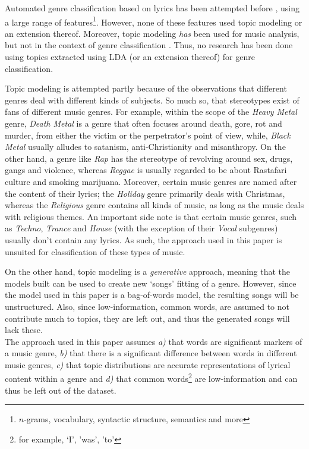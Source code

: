 
Automated genre classification based on lyrics has been attempted before \cite{fell lyrics}, using a large range of features\footnote{$n$-grams, vocabulary, syntactic structure, semantics and more}. However, none of these features used topic modeling or an extension thereof. Moreover, topic modeling \textit{has} been used for music analysis, but not in the context of genre classification \cite{lukiccomparison} \cite{liartists}. Thus, no research has been done using topics extracted using LDA (or an extension thereof) for genre classification. 

Topic modeling is attempted partly because of the observations that different genres deal with different kinds of subjects. So much so, that stereotypes exist of fans of different music genres. For example, within the scope of the \textit{Heavy Metal} genre, \textit{Death Metal} is a genre that often focuses around death, gore, rot and murder, from either the victim or the perpetrator's point of view, while, \textit{Black Metal} usually alludes to satanism, anti-Christianity and misanthropy. On the other hand, a genre like \textit{Rap} has the stereotype of revolving around sex, drugs, gangs and violence, whereas \textit{Reggae} is usually regarded to be about Rastafari culture and smoking marijuana. Moreover, certain music genres are named after the content of their lyrics; the \textit{Holiday} genre primarily deals with Christmas, whereas the \textit{Religious} genre contains all kinds of music, as long as the music deals with religious themes. An important side note is that certain music genres, such as \textit{Techno}, \textit{Trance} and \textit{House} (with the exception of their \textit{Vocal} subgenres) usually don't contain any lyrics. As such, the approach used in this paper is unsuited for classification of these types of music. 

On the other hand, topic modeling is a \textit{generative} approach, meaning that the models built can be used to create new `songs' fitting of a genre. However, since the model used in this paper is a bag-of-words model, the resulting songs will be unstructured. Also, since low-information, common words, are assumed to not contribute much to topics, they are left out, and thus the generated songs will lack these.\\
The approach used in this paper assumes \textit{a)} that words are significant markers of a music genre, \textit{b)} that there is a significant difference between words in different music genres, \textit{c)} that topic distributions are accurate representations of lyrical content within a genre and \textit{d)} that common words\footnote{for example, `I', 'was', 'to'} are low-information and can thus be left out of the dataset. 

